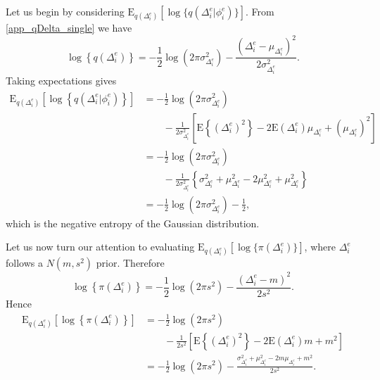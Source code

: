 \documentclass[11pt,a4paper]{article}
\newcommand{\expect}{\textrm{E}}
\begin{document}
Let us begin by considering 
$\expect_{q\left(\Delta_i^{e}\right)}[\log\{q(\Delta_i^{e}\vert\phi_i^{e})\}]$. 
From \eqref{app_qDelta_single} we have 
\begin{equation*} 
\log\left\{q\left(\Delta_i^{e}\right)\right\} = -\frac{1}{2}\log\left(2\pi\sigma_{\Delta_i^{e}}^2 \right) - \frac{\left(\Delta_i^{e} - \mu_{\Delta_i^{e}} \right)^2}{2\sigma_{\Delta_i^{e}}^2}.
\end{equation*}
Taking expectations gives
\begin{align} 
\expect_{q\left(\Delta_i^{e}\right)}\left[\log\left\{q\left(\Delta_i^{e}\Big\vert\phi_i^{e}\right)\right\}\right] &= -\frac{1}{2}\log\left(2\pi\sigma_{\Delta_i^{e}}^2 \right)  \nonumber\\ 
& \qquad - \frac{1}{2\sigma_{\Delta_i^{e}}^2}\left[\expect\left\{\left(\Delta_i^{e}\right)^2\right\} - 2\expect\left(\Delta_i^{e}\right)\mu_{\Delta_i^{e}} + \left(\mu_{\Delta_i^{e}}\right)^2\right] \nonumber\\
&= -\frac{1}{2}\log\left(2\pi\sigma_{\Delta_i^{e}}^2 \right)  \nonumber\\ 
& \qquad - \frac{1}{2\sigma_{\Delta_i^{e}}^2}\left\{\sigma_{\Delta_i^{e}}^2 + \mu_{\Delta_i^{e}}^2 -2\mu_{\Delta_i^{e}}^2 + \mu_{\Delta_i^{e}}^2 \right\} \nonumber\\
&= -\frac{1}{2}\log\left(2\pi\sigma_{\Delta_i^{e}}^2 \right) -\frac{1}{2}, \label{qexpect}
\end{align}
which is the negative entropy of the Gaussian distribution. 

Let us now turn our attention to evaluating 
$\expect_{q\left(\Delta_i^{e}\right)}[\log\{\pi(\Delta_i^{e})\}]$, where 
$\Delta_i^{e}$ follows a $N(m,s^2)$ prior. Therefore
\begin{equation*} 
\log\left\{\pi\left(\Delta_i^{e}\right)\right\} =  -\frac{1}{2}\log\left(2\pi s^2\right) - \frac{\left(\Delta_i^{e} - m\right)^2}{2s^2}. 
\end{equation*}
Hence
\begin{align} 
\expect_{q\left(\Delta_i^{e}\right)}\left[\log\left\{\pi\left(\Delta_i^{e}\right)\right\}\right] &= -\frac{1}{2}\log\left(2\pi s^2 \right)  \nonumber\\     
& \qquad - \frac{1}{2s^2}\left[\expect\left\{\left(\Delta_i^{e}\right)^2\right\} - 2\expect\left(\Delta_i^{e}\right)m + m^2\right] \nonumber\\
&= -\frac{1}{2}\log\left(2\pi s^2 \right) - \frac{\sigma_{\Delta_i^{e}}^2 + \mu_{\Delta_i^{e}}^2 - 2m\mu_{\Delta_i^{e}} + m^2}{2s^2}. \label{pexpect}
\end{align}
\end{document}
